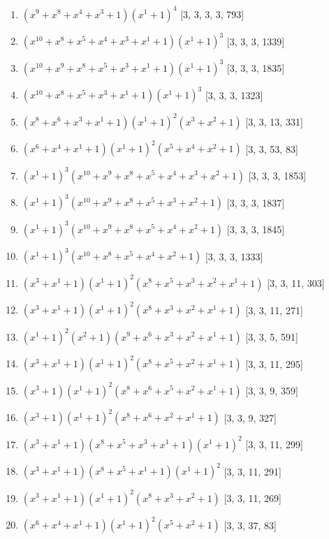 \documentclass[10pt,twocolumn]{article}
\begin{document}
\begin{enumerate}
\item $(x^{9} + x^{8} + x^{4} + x^{3} + 1)(x^{1} + 1)^{4}$  [3, 3, 3, 3, 793]
\item $(x^{10} + x^{8} + x^{5} + x^{4} + x^{3} + x^{1} + 1)(x^{1} + 1)^{3}$  [3, 3, 3, 1339]
\item $(x^{10} + x^{9} + x^{8} + x^{5} + x^{3} + x^{1} + 1)(x^{1} + 1)^{3}$  [3, 3, 3, 1835]
\item $(x^{10} + x^{8} + x^{5} + x^{3} + x^{1} + 1)(x^{1} + 1)^{3}$  [3, 3, 3, 1323]
\item $(x^{8} + x^{6} + x^{3} + x^{1} + 1)(x^{1} + 1)^{2}(x^{3} + x^{2} + 1)$  [3, 3, 13, 331]
\item $(x^{6} + x^{4} + x^{1} + 1)(x^{1} + 1)^{2}(x^{5} + x^{4} + x^{2} + 1)$  [3, 3, 53, 83]
\item $(x^{1} + 1)^{3}(x^{10} + x^{9} + x^{8} + x^{5} + x^{4} + x^{3} + x^{2} + 1)$  [3, 3, 3, 1853]
\item $(x^{1} + 1)^{3}(x^{10} + x^{9} + x^{8} + x^{5} + x^{3} + x^{2} + 1)$  [3, 3, 3, 1837]
\item $(x^{1} + 1)^{3}(x^{10} + x^{9} + x^{8} + x^{5} + x^{4} + x^{2} + 1)$  [3, 3, 3, 1845]
\item $(x^{1} + 1)^{3}(x^{10} + x^{8} + x^{5} + x^{4} + x^{2} + 1)$  [3, 3, 3, 1333]
\item $(x^{3} + x^{1} + 1)(x^{1} + 1)^{2}(x^{8} + x^{5} + x^{3} + x^{2} + x^{1} + 1)$  [3, 3, 11, 303]
\item $(x^{3} + x^{1} + 1)(x^{1} + 1)^{2}(x^{8} + x^{3} + x^{2} + x^{1} + 1)$  [3, 3, 11, 271]
\item $(x^{1} + 1)^{2}(x^{2} + 1)(x^{9} + x^{6} + x^{3} + x^{2} + x^{1} + 1)$  [3, 3, 5, 591]
\item $(x^{3} + x^{1} + 1)(x^{1} + 1)^{2}(x^{8} + x^{5} + x^{2} + x^{1} + 1)$  [3, 3, 11, 295]
\item $(x^{3} + 1)(x^{1} + 1)^{2}(x^{8} + x^{6} + x^{5} + x^{2} + x^{1} + 1)$  [3, 3, 9, 359]
\item $(x^{3} + 1)(x^{1} + 1)^{2}(x^{8} + x^{6} + x^{2} + x^{1} + 1)$  [3, 3, 9, 327]
\item $(x^{3} + x^{1} + 1)(x^{8} + x^{5} + x^{3} + x^{1} + 1)(x^{1} + 1)^{2}$  [3, 3, 11, 299]
\item $(x^{3} + x^{1} + 1)(x^{8} + x^{5} + x^{1} + 1)(x^{1} + 1)^{2}$  [3, 3, 11, 291]
\item $(x^{3} + x^{1} + 1)(x^{1} + 1)^{2}(x^{8} + x^{3} + x^{2} + 1)$  [3, 3, 11, 269]
\item $(x^{6} + x^{4} + x^{1} + 1)(x^{1} + 1)^{2}(x^{5} + x^{2} + 1)$  [3, 3, 37, 83]

\end{enumerate}
\end{document}
